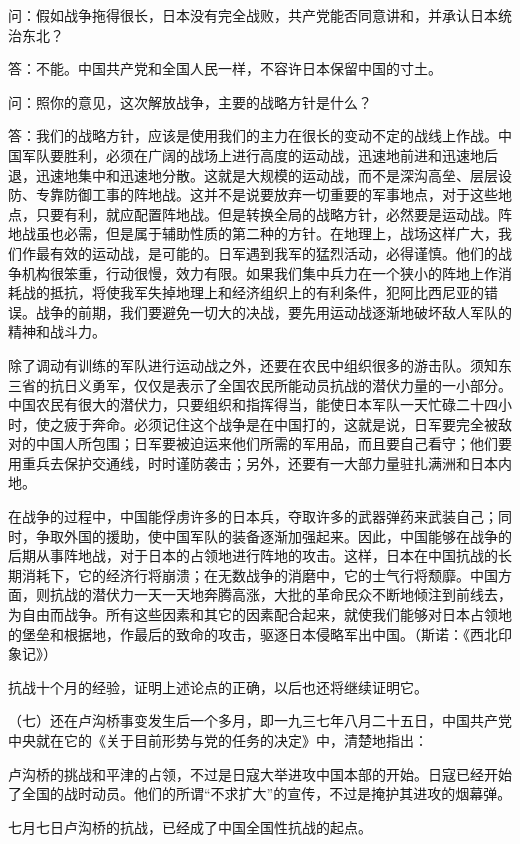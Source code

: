\documentclass[UTF8, 12pt, a4paper]{ctexrep}
\begin{document}
问：假如战争拖得很长，日本没有完全战败，共产党能否同意讲和，并承认日本统治东北？

答：不能。中国共产党和全国人民一样，不容许日本保留中国的寸土。

问：照你的意见，这次解放战争，主要的战略方针是什么？

答：我们的战略方针，应该是使用我们的主力在很长的变动不定的战线上作战。中国军队要胜利，必须在广阔的战场上进行高度的运动战，迅速地前进和迅速地后退，迅速地集中和迅速地分散。这就是大规模的运动战，而不是深沟高垒、层层设防、专靠防御工事的阵地战。这并不是说要放弃一切重要的军事地点，对于这些地点，只要有利，就应配置阵地战。但是转换全局的战略方针，必然要是运动战。阵地战虽也必需，但是属于辅助性质的第二种的方针。在地理上，战场这样广大，我们作最有效的运动战，是可能的。日军遇到我军的猛烈活动，必得谨慎。他们的战争机构很笨重，行动很慢，效力有限。如果我们集中兵力在一个狭小的阵地上作消耗战的抵抗，将使我军失掉地理上和经济组织上的有利条件，犯阿比西尼亚的错误。战争的前期，我们要避免一切大的决战，要先用运动战逐渐地破坏敌人军队的精神和战斗力。

除了调动有训练的军队进行运动战之外，还要在农民中组织很多的游击队。须知东三省的抗日义勇军，仅仅是表示了全国农民所能动员抗战的潜伏力量的一小部分。中国农民有很大的潜伏力，只要组织和指挥得当，能使日本军队一天忙碌二十四小时，使之疲于奔命。必须记住这个战争是在中国打的，这就是说，日军要完全被敌对的中国人所包围；日军要被迫运来他们所需的军用品，而且要自己看守；他们要用重兵去保护交通线，时时谨防袭击；另外，还要有一大部力量驻扎满洲和日本内地。

在战争的过程中，中国能俘虏许多的日本兵，夺取许多的武器弹药来武装自己；同时，争取外国的援助，使中国军队的装备逐渐加强起来。因此，中国能够在战争的后期从事阵地战，对于日本的占领地进行阵地的攻击。这样，日本在中国抗战的长期消耗下，它的经济行将崩溃；在无数战争的消磨中，它的士气行将颓靡。中国方面，则抗战的潜伏力一天一天地奔腾高涨，大批的革命民众不断地倾注到前线去，为自由而战争。所有这些因素和其它的因素配合起来，就使我们能够对日本占领地的堡垒和根据地，作最后的致命的攻击，驱逐日本侵略军出中国。（斯诺：《西北印象记》）

抗战十个月的经验，证明上述论点的正确，以后也还将继续证明它。

（七）还在卢沟桥事变发生后一个多月，即一九三七年八月二十五日，中国共产党中央就在它的《关于目前形势与党的任务的决定》中，清楚地指出：

卢沟桥的挑战和平津的占领，不过是日寇大举进攻中国本部的开始。日寇已经开始了全国的战时动员。他们的所谓“不求扩大”的宣传，不过是掩护其进攻的烟幕弹。

七月七日卢沟桥的抗战，已经成了中国全国性抗战的起点。
\end{document}
